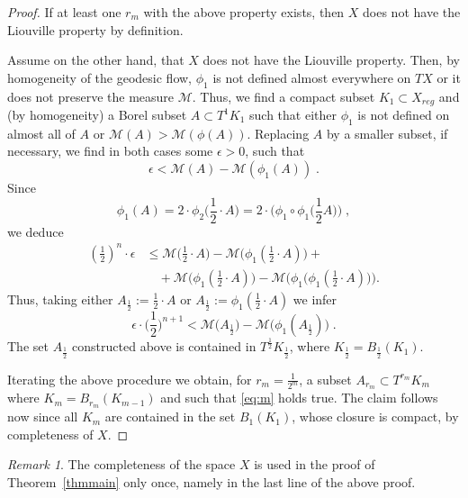 \documentclass[12pt,leqno,intlimits]{amsart}
\numberwithin{equation}{section}
\theoremstyle{definition}
\theoremstyle{remark}
\newtheorem{rem}[thm]{Remark}
\newcommand{\tref}[1]{Theorem~\ref{#1}}
\begin{document}
\begin{proof}
If at least one $r_m$ with the above property exists, then $X$  does not have the Liouville property by  definition.

Assume on the other hand, that $X$ does not have the Liouville property. Then,  by homogeneity of the geodesic flow,  $\phi _1$ is not defined almost everywhere on $TX$ or it does not preserve the measure $\mathcal M$. Thus, we find a compact subset $K_1\subset X_{reg}$ and (by homogeneity) a Borel subset $A\subset T^1 K_1$ such that either $\phi_1$ is not defined on almost all of $A$ or $\mathcal M (A) > \mathcal M(\phi (A))$.  Replacing $A$
by a smaller  subset, if necessary,  we find in both cases some $\epsilon >0$, such that   $$\epsilon < \mathcal M (A) - \mathcal M(\phi_1 (A)) \; .$$
Since $$\phi_1 (A)=2\cdot \phi _2 \Big (\frac 1 2 \cdot A \Big)=2\cdot \Big(\phi _1 \circ \phi_1 \Big (\frac 1 2 A \Big ) \Big ) \; ,$$
we deduce
\begin{align*}
(\tfrac 1 2)^n \cdot \epsilon &\leq  \mathcal M \big(\tfrac 1 2\cdot  A \big) - \mathcal M \big( \phi_1 (\tfrac 1 2\cdot  A ) \big) +
\\
&\quad+\mathcal M \big(\phi_1 (\tfrac 1 2\cdot  A )\big)
 - \mathcal M\big (\phi_1 \big (\phi _1 (\tfrac 1 2\cdot  A )\big) \big).
\end{align*}
Thus,  taking  either $A_{\frac 1 2} := \frac 1 2  \cdot A$ or  $A_{\frac 1 2} := \phi_1 (\frac 1 2 \cdot A)$ we infer
$$\epsilon \cdot \Big(\frac 1 2 \Big )^{n+1}  < \mathcal M \big(A _{\frac 1 2} \big) - \mathcal M \big( \phi_1 (A _{\frac 1 2}) \big) \; .$$
The set $A_{\frac 1 2}$ constructed above is contained in $T^{\frac 1 2} K_{\frac 1 2}$, where $K _{\frac 1 2}  =B_{\frac 1 2} (K_1)$.

Iterating the above procedure we obtain,  for $r_m =\frac 1 {2^m}$,   a subset $A_{r_m} \subset T^{r_m} K_m$  where  $K_m =B_{r_m} (K_{m-1})$
 and such that \eqref{eq:m} holds true.
The claim follows now since all $K_m$ are contained in the set $B_1 (K_1)$, whose closure is  compact, by completeness of $X$.
\end{proof}


\begin{rem}
The completeness of the space $X$ is used in the proof of \tref{thmmain} only once, namely in the last line of the above proof.
\end{rem}
\end{document}
